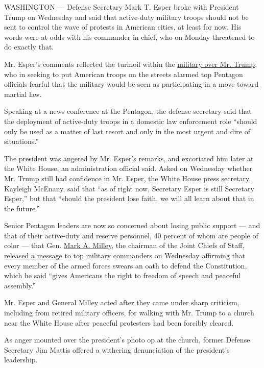 WASHINGTON --- Defense Secretary Mark T. Esper broke with President
Trump on Wednesday and said that active-duty military troops should not
be sent to control the wave of protests in American cities, at least for
now. His words were at odds with his commander in chief, who on Monday
threatened to do exactly that.

Mr. Esper's comments reflected the turmoil within the
\href{https://www.nytimes.com/2020/06/04/us/politics/trump-military-protests.html}{military
over Mr. Trump}, who in seeking to put American troops on the streets
alarmed top Pentagon officials fearful that the military would be seen
as participating in a move toward martial law.

Speaking at a news conference at the Pentagon, the defense secretary
said that the deployment of active-duty troops in a domestic law
enforcement role ``should only be used as a matter of last resort and
only in the most urgent and dire of situations.''

The president was angered by Mr. Esper's remarks, and excoriated him
later at the White House, an administration official said. Asked on
Wednesday whether Mr. Trump still had confidence in Mr. Esper, the White
House press secretary, Kayleigh McEnany, said that ``as of right now,
Secretary Esper is still Secretary Esper,'' but that ``should the
president lose faith, we will all learn about that in the future.''

Senior Pentagon leaders are now so concerned about losing public support
--- and that of their active-duty and reserve personnel, 40 percent of
whom are people of color --- that Gen.
\href{https://www.nytimes.com/2020/07/09/us/politics/milley-trump-confederate-base-names.html}{Mark
A. Milley}, the chairman of the Joint Chiefs of Staff,
\href{https://int.nyt.com/data/documenthelper/6990-milley-memo/fc4fb1c4459fbdbc87a7/optimized/full.pdf\#page=1}{released
a message} to top military commanders on Wednesday affirming that every
member of the armed forces swears an oath to defend the Constitution,
which he said ``gives Americans the right to freedom of speech and
peaceful assembly.''

Mr. Esper and General Milley acted after they came under sharp
criticism, including from retired military officers, for walking with
Mr. Trump to a church near the White House after peaceful protesters had
been forcibly cleared.

As anger mounted over the president's photo op at the church, former
Defense Secretary Jim Mattis offered a withering denunciation of the
president's leadership.

